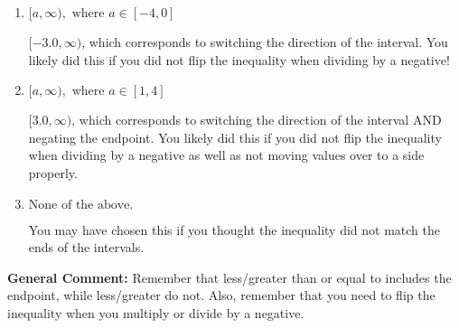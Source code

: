 \documentclass{extbook}[14pt]
\begin{document}
\begin{enumerate}
{\begin{enumerate}[label=\Alph*.]
* $(-\infty, -3.0]$, which is the correct option.
\item \( [a, \infty), \text{ where } a \in [-4, 0] \)

 $[-3.0, \infty)$, which corresponds to switching the direction of the interval. You likely did this if you did not flip the inequality when dividing by a negative!
\item \( [a, \infty), \text{ where } a \in [1, 4] \)

 $[3.0, \infty)$, which corresponds to switching the direction of the interval AND negating the endpoint. You likely did this if you did not flip the inequality when dividing by a negative as well as not moving values over to a side properly.
\item \( \text{None of the above}. \)

You may have chosen this if you thought the inequality did not match the ends of the intervals.
\end{enumerate}

\textbf{General Comment:} Remember that less/greater than or equal to includes the endpoint, while less/greater do not. Also, remember that you need to flip the inequality when you multiply or divide by a negative.
}
\end{enumerate}
\end{document}
